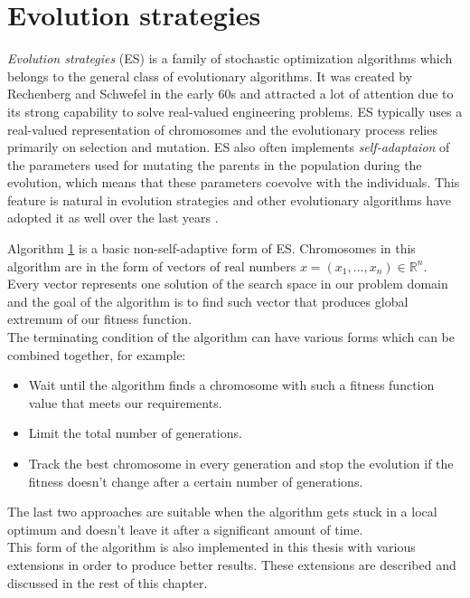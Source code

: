 \section{Evolution strategies} \label{evolution-strategies}
\textit{Evolution strategies} (ES) is a family of stochastic optimization algorithms which belongs to the general class of evolutionary algorithms. It was created by Rechenberg and Schwefel in the early 60s and attracted a lot of attention due to its strong capability to solve real-valued engineering problems. ES typically uses a real-valued representation of chromosomes and the evolutionary process relies primarily on selection and mutation. ES also often implements \textit{self-adaptaion} of the parameters used for mutating the parents in the population during the evolution, which means that these parameters coevolve with the individuals. This feature is natural in evolution strategies and other evolutionary algorithms have adopted it as well over the last years \cite{natural-computing-algorithms, introduction-to-evolutionary-computing}.

Algorithm \ref{evolution-strategies} is a basic non-self-adaptive form of ES. Chromosomes in this algorithm are in the form of vectors of real numbers $x = (x_1,...,x_n) \in \mathbb{R}^n$. Every vector represents one solution of the search space in our problem domain and the goal of the algorithm is to find such vector that produces global extremum of our fitness function.\\
The terminating condition of the algorithm can have various forms which can be combined together, for example:

 \begin{itemize}
    \item Wait until the algorithm finds a chromosome with such a fitness function value that meets our requirements.
    \item Limit the total number of generations.
    \item Track the best chromosome in every generation and stop the evolution if the fitness doesn't change after a certain number of generations.
 \end{itemize}

 The last two approaches are suitable when the algorithm gets stuck in a local optimum and doesn't leave it after a significant amount of time.\\
This form of the algorithm is also implemented in this thesis with various extensions in order to produce better results. These extensions are described and discussed in the rest of this chapter.

